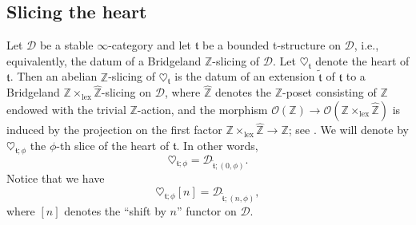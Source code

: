 \documentclass{article}
\theoremstyle{definition}
\newcommand{\Z}{\mathbb{Z}}
\newcommand{\Oo}{\mathcal{O}}
\newcommand{\tee}{\mathfrak{t}}
\begin{document}
\subsection{Slicing the heart}\label{sec:heart}
Let $\mathscr{D}$ be a stable $\infty$-category {\color{red} and let $\tee$ be a bounded t-structure on $\mathscr{D}$, i.e., equivalently, the datum of} a Bridgeland $\Z$-slicing of $\mathscr{D}$. Let $\heartsuit_{\mathfrak{t}}$ denote the heart of $\mathfrak{t}$. Then an abelian $\Z$-slicing of $\heartsuit_{\mathfrak{t}}$ is the datum of an extension $\tilde{\tee}$ of $\tee$ to a Bridgeland $\Z\times_{\mathrm{lex}}\hat{\Z}$-slicing on $\mathscr{D}$, where $\hat{\Z}$ denotes the $\Z$-poset consisting of $\Z$ endowed with the trivial $\Z$-action, and the morphism $\Oo(\Z)\to \Oo(\Z\times_{\mathrm{lex}}\hat{\Z})$ is induced by the projection on the first factor $\Z\times_{\mathrm{lex}}\hat{\Z}\to \Z$; see \cite[Section 5]{fosco}. We will denote by $\heartsuit_{\tee;\phi}$ the $\phi$-th slice of the heart of $\tee$. In other words,
\[
\heartsuit_{\tee;\phi}=\mathscr{D}_{\tilde{\tee};(0,\phi)}.
\]
Notice that we have
\[
\heartsuit_{\tee;\phi}[n]=\mathscr{D}_{\tilde{\tee};(n,\phi)},
\]
where $[n]$ denotes the ``shift by $n$'' functor on $\mathscr{D}$.
\end{document}
